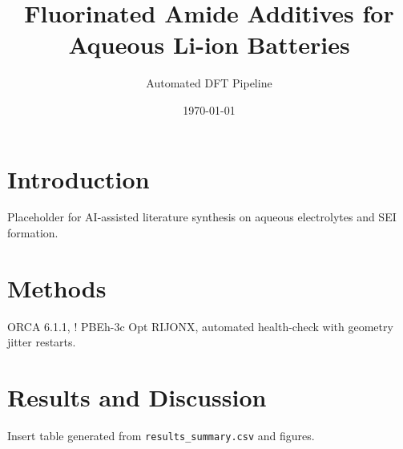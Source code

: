 \documentclass[11pt]{article}
\title{Fluorinated Amide Additives for Aqueous Li-ion Batteries}
\author{Automated DFT Pipeline}
\date{\today}
\begin{document}
\maketitle
\section{Introduction}
Placeholder for AI-assisted literature synthesis on aqueous electrolytes and SEI formation.
\section{Methods}
ORCA 6.1.1, ! PBEh-3c Opt RIJONX, automated health-check with geometry jitter restarts.
\section{Results and Discussion}
Insert table generated from \texttt{results\_summary.csv} and figures.
\end{document}
